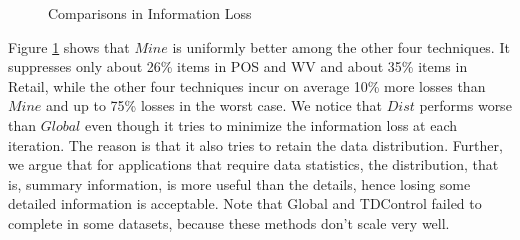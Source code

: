\begin{figure}[tb]
\centering
{}
\caption{Comparisons in Information Loss}\label{fig:loss}
\end{figure}

Figure \ref{fig:loss}
shows that $Mine$ is uniformly better among the other four techniques.
It suppresses only about 26\% items in POS and WV and about 35\% items in
Retail, while the other four techniques incur on average 10\% more losses
than  $Mine$ and up to 75\% losses in the worst case. We notice that $Dist$
performs worse than  $Global$ even though it tries to minimize the
information loss at each iteration.
The reason is that it also tries to retain the data
distribution. 
Further, we argue that for applications that require data statistics,
the distribution, that is, summary information, is more useful than the
details, hence losing some detailed information is acceptable.
Note that Global and TDControl failed to complete in some datasets,
because these methods don't scale very well.

